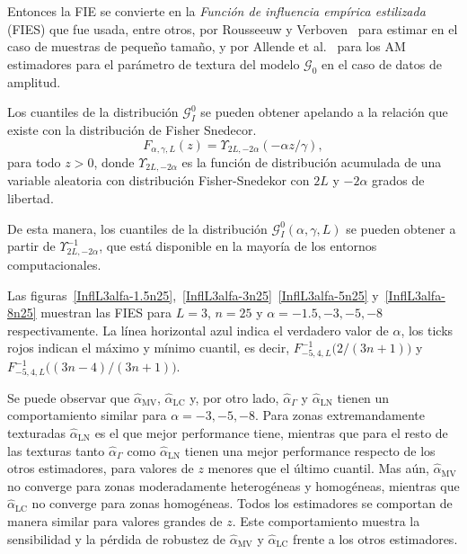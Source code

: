 Entonces la FIE se convierte en la \textit{Función de influencia empírica estilizada} (FIES) que fue usada, entre otros, por Rousseeuw y Verboven~\cite{RousseeuwCSDA} para estimar en el caso de muestras de pequeño tamaño, y por Allende et al.~\cite{AllendeFreryetal:JSCS:05} para los AM estimadores para el parámetro de textura del modelo $\mathcal{G}_0$ en el caso de datos de amplitud.

Los cuantiles de la distribución $\mathcal{G}_I^0$ se pueden obtener apelando a la relación que existe con la distribución de Fisher Snedecor.
\begin{equation}
F_{\alpha,\gamma,L}(z) = \Upsilon_{2L, -2\alpha}(-\alpha  z / \gamma),
\label{eq:CDFG0}
\end{equation}
para todo $z>0$, donde $\Upsilon_{2L, -2\alpha}$ es la función de distribución acumulada de una variable aleatoria con distribución Fisher-Snedekor con $2L$ y $-2\alpha$ grados de libertad.

De esta manera, los cuantiles de la distribución $\mathcal{G}_I^0(\alpha,\gamma,L)$ se pueden obtener a partir de $\Upsilon^{-1}_{2L,-2\alpha}$, que está disponible en la mayoría de los entornos computacionales.

Las figuras~\ref{InflL3alfa-1.5n25},~\ref{InflL3alfa-3n25}~\ref{InflL3alfa-5n25} y~\ref{InflL3alfa-8n25} muestran las FIES para $L=3$, $n=25$ y $\alpha=-1.5, -3, -5, -8$ respectivamente. La línea horizontal azul indica el verdadero valor de $\alpha$, los ticks rojos indican el máximo y mínimo cuantil, es decir, $F^{-1}_{-5,4,L}\big(2/(3n+1)\big)$ y $F^{-1}_{-5,4,L}\big((3n-4)/(3n+1)\big)$. 

Se puede observar que $\widehat{\alpha}_{\text{MV}}$, $\widehat{\alpha}_{\text{LC}}$ y, por otro lado, $\widehat{\alpha}_{\Gamma}$ y $\widehat{\alpha}_{\text{LN}}$ tienen un comportamiento similar para $\alpha=-3, -5, -8$. Para zonas extremandamente texturadas $\widehat{\alpha}_{\text{LN}}$ es el que mejor performance tiene, mientras que para el resto de las texturas tanto $\widehat{\alpha}_{\Gamma}$ como $\widehat{\alpha}_{\text{LN}}$ tienen una mejor performance respecto de los otros estimadores, para valores de $z$ menores que el último cuantil. Mas aún, $\widehat{\alpha}_{\text{MV}}$ no converge para zonas moderadamente heterogéneas y homogéneas, mientras que $\widehat{\alpha}_{\text{LC}}$ no converge para zonas homogéneas. Todos los estimadores se comportan de manera similar para valores grandes de $z$. Este comportamiento muestra la sensibilidad y la pérdida de robustez de $\widehat{\alpha}_{\text{MV}}$ y $\widehat{\alpha}_{\text{LC}}$ frente a los otros estimadores. 

